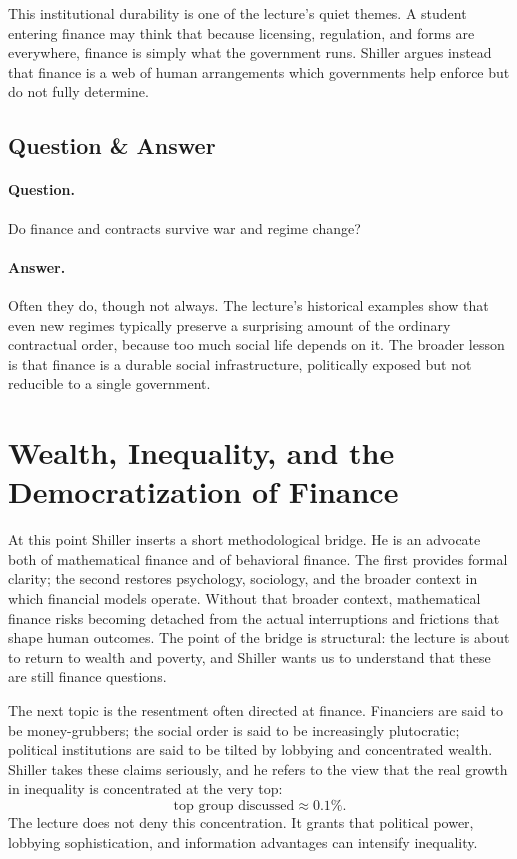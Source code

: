 This institutional durability is one of the lecture's quiet themes. A student entering finance may think that because licensing, regulation, and forms are everywhere, finance is simply what the government runs. Shiller argues instead that finance is a web of human arrangements which governments help enforce but do not fully determine.

\subsection{Question \& Answer}

\paragraph{Question.} Do finance and contracts survive war and regime change?

\paragraph{Answer.} Often they do, though not always. The lecture's historical examples show that even new regimes typically preserve a surprising amount of the ordinary contractual order, because too much social life depends on it. The broader lesson is that finance is a durable social infrastructure, politically exposed but not reducible to a single government.

\section{Wealth, Inequality, and the Democratization of Finance}

At this point Shiller inserts a short methodological bridge. He is an advocate both of mathematical finance and of behavioral finance. The first provides formal clarity; the second restores psychology, sociology, and the broader context in which financial models operate. Without that broader context, mathematical finance risks becoming detached from the actual interruptions and frictions that shape human outcomes. The point of the bridge is structural: the lecture is about to return to wealth and poverty, and Shiller wants us to understand that these are still finance questions.

The next topic is the resentment often directed at finance. Financiers are said to be money-grubbers; the social order is said to be increasingly plutocratic; political institutions are said to be tilted by lobbying and concentrated wealth. Shiller takes these claims seriously, and he refers to the view that the real growth in inequality is concentrated at the very top:
\begin{equation}
\text{top group discussed} \approx 0.1\%.
\end{equation}
The lecture does not deny this concentration. It grants that political power, lobbying sophistication, and information advantages can intensify inequality.

